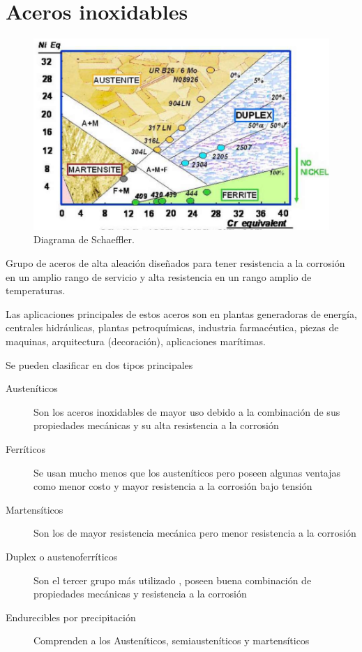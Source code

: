 \part{Aceros inoxidables}


\begin{figure}[htb]
	\centering
	\includegraphics[width=0.6\linewidth]{fig/schaeffler.png}
	\caption{Diagrama de Schaeffler.}
	\label{fig:schaeffler}
\end{figure}



Grupo de aceros de alta aleación diseñados para tener resistencia a la corrosión en un amplio rango de servicio y alta resistencia en un rango amplio de temperaturas.

Las aplicaciones principales de estos aceros son en plantas generadoras de energía, centrales hidráulicas, plantas petroquímicas, industria farmacéutica, piezas de maquinas, arquitectura (decoración), aplicaciones marítimas.

Se pueden clasificar en dos tipos principales
\begin{description}
	\item[Austeníticos] Son los aceros inoxidables de mayor uso debido a la combinación de sus propiedades mecánicas y su alta resistencia a la corrosión
	\item[Ferríticos] Se usan mucho menos que los austeníticos pero poseen algunas ventajas como menor costo y mayor resistencia a la corrosión bajo tensión
	\item[Martensíticos] Son los de mayor resistencia mecánica pero menor resistencia a la corrosión
	\item[Duplex o austenoferríticos] Son el tercer grupo más utilizado , poseen buena combinación de propiedades mecánicas y resistencia a la corrosión
	\item[Endurecibles por precipitación] Comprenden a los Austeníticos, semiausteníticos y martensíticos  
\end{description}

